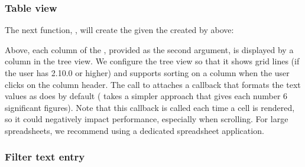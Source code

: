 \documentclass[article,shortnames]{jss}
\begin{document}
\subsubsection{Table view}

The next function, ,  will create the
 given the  created by
 above:
Above, each column of the ,
provided as the second argument, is displayed by a column in the tree
view. We configure the tree view so that it shows grid lines (if the
user has  2.10.0 or higher) and supports sorting on a column
when the user clicks on the column header.
The call to  attaches a callback that formats
the text values as  does by default ( takes a
simpler approach that gives each number 6 significant figures). Note
that this callback is called each time a cell is rendered, so it could
negatively impact performance, especially when scrolling. For large
spreadsheets, we recommend using a dedicated spreadsheet application. 


\subsubsection{Filter text entry}
\end{document}
